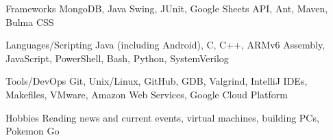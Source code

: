 

\begin{cvskills}

  \cvskill
    {Frameworks} %
    {MongoDB, Java Swing, JUnit, Google Sheets API, Ant, Maven, Bulma CSS} %

  \cvskill
    {Languages/Scripting} %
    {Java (including Android), C, C++, ARMv6 Assembly, JavaScript, PowerShell, Bash, Python, SystemVerilog} %
    
  \cvskill
    {Tools/DevOps} %
    {Git, Unix/Linux, GitHub, GDB, Valgrind, IntelliJ IDEs, Makefiles, VMware, Amazon Web Services, Google Cloud Platform} %

  \cvskill
  {Hobbies} %
  {Reading news and current events, virtual machines, building PCs, Pokemon Go} %

\end{cvskills}
